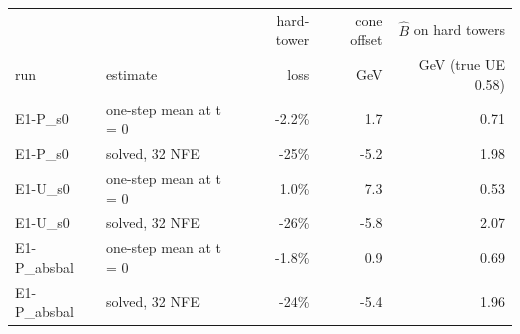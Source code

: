 \scriptsize
\setlength{\tabcolsep}{3pt}
\begin{tabular}{llrrr}
\toprule
 & & hard-tower & cone offset & $\hat B$ on hard towers \\
run & estimate & loss & GeV & GeV (true UE 0.58) \\
\midrule
E1-P\_s0 & one-step mean at t = 0 & -2.2\% & 1.7 & 0.71 \\
E1-P\_s0 & solved, 32 NFE & -25\% & -5.2 & 1.98 \\
E1-U\_s0 & one-step mean at t = 0 & 1.0\% & 7.3 & 0.53 \\
E1-U\_s0 & solved, 32 NFE & -26\% & -5.8 & 2.07 \\
E1-P\_absbal & one-step mean at t = 0 & -1.8\% & 0.9 & 0.69 \\
E1-P\_absbal & solved, 32 NFE & -24\% & -5.4 & 1.96 \\
\bottomrule
\end{tabular}
